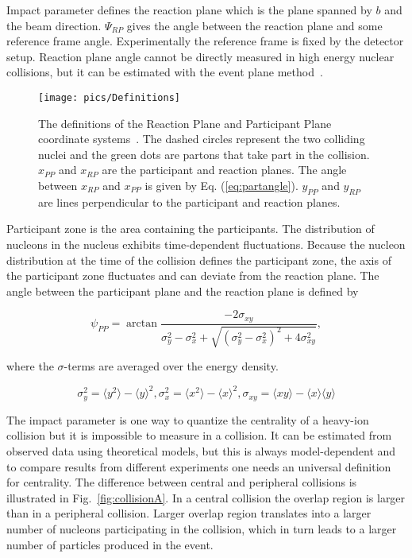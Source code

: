 Impact parameter defines the reaction plane which is the plane spanned by $b$ and the beam direction. $\Psi_{RP}$ gives the angle between the reaction plane and some reference frame angle. Experimentally the reference frame is fixed by the detector setup. Reaction plane angle cannot be directly measured in high energy nuclear collisions, but it can be estimated with the event plane method~\cite{Voloshin:2008dg}. 
\begin{figure}[h!]
\centering
\texttt{[image: pics/Definitions]}
\caption[The definitions of the Reaction Plane and Participant Plane coordinate systems]{The definitions of the Reaction Plane and Participant Plane coordinate systems~\cite{Voloshin:2007pc}. The dashed circles represent the two colliding nuclei and the green dots are partons that take part  in the collision. $x_{PP}$ and $x_{RP}$ are the participant and reaction planes. The angle between $x_{RP}$ and $x_{PP}$ is given by Eq. (\ref{eq:partangle}). $y_{PP}$ and $y_{RP}$ are lines perpendicular to the participant and reaction planes. }
\label{fig:planes}
\end{figure}


Participant zone is the area containing the participants. The distribution of nucleons in the nucleus exhibits time-dependent fluctuations. Because the nucleon distribution at the time of the collision defines the participant zone, the axis of the participant zone fluctuates and can deviate from the reaction plane. The angle between the participant plane and the reaction plane is defined by ~\cite{Holopainen:2010gz}

\begin{equation}
\psi_{PP}=\arctan \frac{-2\sigma_{xy}}{\sigma_y^2-\sigma_x^2+\sqrt{\left(\sigma_y^2-\sigma_x^2\right)^2+4\sigma_{xy}^2}},
\label{eq:partangle}
\end{equation}

\noindent where the $\sigma$-terms are averaged over the energy density.

\begin{equation}
\sigma_y^2=\langle y^2\rangle-\langle y \rangle ^2, \sigma_x^2=\langle x^2\rangle-\langle x \rangle ^2, \sigma_{xy}=\langle xy \rangle - \langle x \rangle \langle y \rangle
\end{equation}

The impact parameter is one way to quantize the centrality of a heavy-ion collision but it is impossible to measure in a collision. It can be estimated from observed data using theoretical models, but this is always model-dependent and to compare results from different experiments one needs an universal definition for centrality. The difference between central and peripheral collisions is illustrated in Fig.~\ref{fig:collisionA}. In a central collision the overlap region is larger than in a peripheral collision. Larger overlap region translates into a larger number of nucleons participating in the collision, which in turn leads to a larger number of particles produced in the event.


